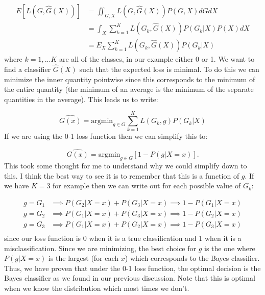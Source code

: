 \begin{equation}
\begin{split}
E[L(G, \hat{G}(X))] & = \iint_{G, X} {L(G, \hat{G}(X)) P(G, X) dG dX} \\
& = \int_{X} \sum_{k=1}^{K} {L(G_k, \hat{G}(X)) P(G_k|X) P(X) dX} \\
&= E_{X} \sum_{k=1}^{K} {L(G_k, \hat{G}(X)) P(G_k|X)}
\end{split}
\end{equation}
where $k=1,...K$ are all of the classes, in our example either 0 or 1. We want to find a classifier $\hat{G}(X)$ such that the expected loss is minimal. To do this we can minimize the inner quantity pointwise since this corresponds to the minimum of the entire quantity (the minimum of an average is the minimum of the separate quantities in the average). This leads us to write:

\begin{equation}
\hat{G(x)} = \text{argmin}_{g \in G} \sum_{k=1}^{K} {L(G_k, g) P(G_k|X)}
\end{equation}
If we are using the 0-1 loss function then we can simplify this to:

\begin{equation}
\hat{G(x)} = \text{argmin}_{g \in G} \left[1 - P(g|X=x) \right].
\end{equation}
This took some thought for me to understand why we could simplify down to this. I think the best way to see it is to remember that this is a function of $g$. If we have $K=3$ for example then we can write out for each possible value of $G_k$:

\begin{equation}
\begin{split}
g=G_1 & \implies P(G_2|X=x) + P(G_3|X=x) \implies 1-P(G_1|X=x)\\
g=G_2 & \implies P(G_1|X=x) + P(G_3|X=x) \implies 1-P(G_2|X=x)\\
g=G_3 & \implies P(G_1|X=x) + P(G_2|X=x) \implies 1-P(G_3|X=x)\\
\end{split}
\end{equation}
since our loss function is 0 when it is a true classification and 1 when it is a misclassification. Since we are minimizing, the best choice for $g$ is the one where $P(g|X=x)$ is the largest (for each $x$) which corresponds to the Bayes classifier. Thus, we have proven that under the 0-1 loss function, the optimal decision is the Bayes classifier as we found in our previous discussion. Note that this is optimal when we know the distribution which most times we don't.

